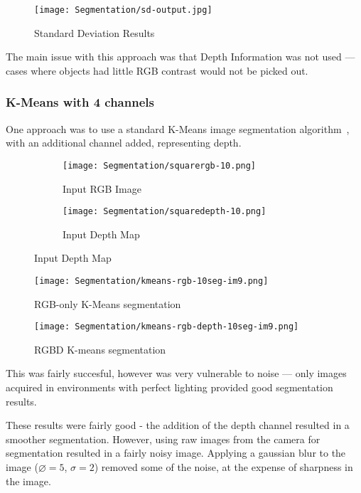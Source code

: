 \begin{figure}[H]
   \centering
   \texttt{[image: Segmentation/sd-output.jpg]}
   \caption{Standard Deviation Results}

\end{figure}

The main issue with this approach was that Depth Information was not used --- cases where objects had little RGB contrast would not be picked out. 

\subsubsection{K-Means with 4 channels}
One approach was to use a standard K-Means image segmentation algorithm~\cite{kmeans-matlab}, with an additional channel added, representing depth. 

\begin{figure}[H]
    \centering
    \begin{subfigure}[b]{0.45\textwidth}
        \centering
        \texttt{[image: Segmentation/squarergb-10.png]}
        \caption{Input RGB Image}
    \end{subfigure}
    \hfill
    \begin{subfigure}[b]{0.45\textwidth}
        \centering
        \texttt{[image: Segmentation/squaredepth-10.png]}
        \caption{Input Depth Map}
    \end{subfigure}
\end{figure}

\begin{figure}[H]
    \centering
    \texttt{[image: Segmentation/kmeans-rgb-10seg-im9.png]}
    \caption{RGB-only K-Means segmentation}
\end{figure}

\begin{figure}[H]
    \centering
    \texttt{[image: Segmentation/kmeans-rgb-depth-10seg-im9.png]}
    \caption{RGBD K-means segmentation}
\end{figure}

This was fairly succesful, however was very vulnerable to noise --- only images acquired in environments with perfect lighting provided good segmentation results. 

These results were fairly good - the addition of the depth channel resulted in a smoother segmentation. However, using raw images from the camera for segmentation resulted in a fairly noisy image. Applying a gaussian blur to the image ($\diameter = 5$, $\sigma = 2$) removed some of the noise, at the expense of sharpness in the image.

